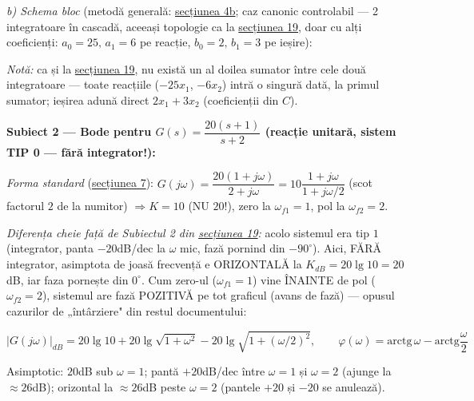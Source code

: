 \documentclass[10pt,a4paper]{article}
\newcommand{\tip}[1]{\textcolor{blue!55!black}{#1}}
\begin{document}
\textit{b) Schema bloc} (metodă generală: \hyperref[sec:4b]{secțiunea 4b}; caz canonic controlabil — 2 integratoare în cascadă, aceeași topologie ca la \hyperref[sec:19]{secțiunea 19}, doar cu alți coeficienți: $a_0{=}25,\,a_1{=}6$ pe reacție, $b_0{=}2,\,b_1{=}3$ pe ieșire):
\begin{center}
\tip{\textit{Notă:} ca și la \hyperref[sec:19]{secțiunea 19}, nu există un al doilea sumator între cele două integratoare — toate reacțiile ($-25x_1$, $-6x_2$) intră o singură dată, la primul sumator; ieșirea adună direct $2x_1{+}3x_2$ (coeficienții din $C$).}
\end{center}

\textbf{Subiect 2 — Bode pentru $G(s)=\dfrac{20(s+1)}{s+2}$ (reacție unitară, sistem TIP 0 — fără integrator!):}

\textit{Forma standard} (\hyperref[sec:7]{secțiunea 7}): $G(j\omega)=\dfrac{20(1+j\omega)}{2+j\omega}=10\dfrac{1+j\omega}{1+j\omega/2}$ (scot factorul $2$ de la numitor) $\Rightarrow K{=}10$ (NU $20$!), zero la $\omega_{f1}{=}1$, pol la $\omega_{f2}{=}2$.

\textit{Diferența cheie față de Subiectul 2 din \hyperref[sec:19]{secțiunea 19}:} acolo sistemul era tip $1$ (integrator, panta $-20$dB/dec la $\omega$ mic, fază pornind din $-90^\circ$). Aici, FĂRĂ integrator, asimptota de joasă frecvență e ORIZONTALĂ la $K_{dB}{=}20\lg10{=}20$dB, iar faza pornește din $0^\circ$. Cum zero-ul ($\omega_{f1}{=}1$) vine ÎNAINTE de pol ($\omega_{f2}{=}2$), sistemul are fază POZITIVĂ pe tot graficul (avans de fază) — opusul cazurilor de „întârziere" din restul documentului:
\begin{keyeq}\color{red!65!black}
$$|G(j\omega)|_{dB}=20\lg10+20\lg\sqrt{1+\omega^2}-20\lg\sqrt{1+(\omega/2)^2},\qquad \varphi(\omega)=\mathrm{arctg}\,\omega-\mathrm{arctg}\dfrac\omega2$$
\end{keyeq}
Asimptotic: $20$dB sub $\omega{=}1$; pantă $+20$dB/dec între $\omega{=}1$ și $\omega{=}2$ (ajunge la ${\approx}26$dB); orizontal la ${\approx}26$dB peste $\omega{=}2$ (pantele $+20$ și $-20$ se anulează).
\end{document}
